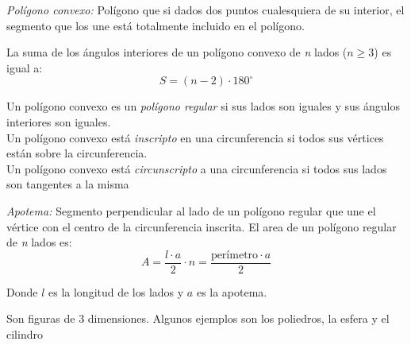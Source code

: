 \emph{Polígono convexo:} Polígono que si dados dos puntos cualesquiera de su interior, el segmento que los une está totalmente incluido en el polígono. 

\begin{center}
\hspace{1cm}
\end{center}

La suma de los ángulos interiores de un polígono convexo de \emph{n} lados ($n \geq 3$) es igual a:
$$\boxed{S = (n-2) \cdot 180^\circ}$$

\noindent Un polígono convexo es un \emph{polígono regular} si sus lados son iguales y sus ángulos interiores son iguales.\\

Un polígono convexo está \emph{inscripto} en una circunferencia si todos sus vértices están sobre la circunferencia.\\
Un polígono convexo está \emph{circunscripto} a una circunferencia si todos sus lados son tangentes a la misma


\emph{Apotema: } Segmento perpendicular al lado de un polígono regular que une el vértice con el centro de la circunferencia inscrita. El area de un polígono regular de \emph{n} lados es:
$$\boxed{A = \frac{l \cdot a}{2} \cdot n = \frac{\text{perímetro} \cdot a}{2}}$$
\begin{center}
    Donde $l$ es la longitud de los lados y $a$ es la apotema.
\end{center}

Son figuras de 3 dimensiones. Algunos ejemplos son los poliedros, la esfera y el cilindro

